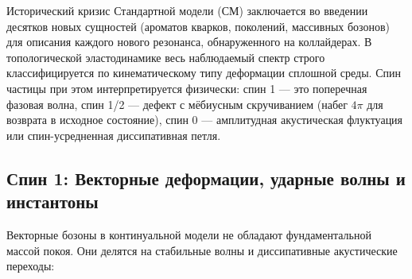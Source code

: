 \documentclass[11pt,a4paper]{article}
\begin{document}
	Исторический кризис Стандартной модели (СМ) заключается во введении десятков новых сущностей (ароматов кварков, поколений, массивных бозонов) для описания каждого нового резонанса, обнаруженного на коллайдерах. В топологической эластодинамике весь наблюдаемый спектр строго классифицируется по кинематическому типу деформации сплошной среды. Спин частицы при этом интерпретируется физически: спин 1 — это поперечная фазовая волна, спин 1/2 — дефект с мёбиусным скручиванием (набег $4\pi$ для возврата в исходное состояние), спин 0 — амплитудная акустическая флуктуация или спин-усредненная диссипативная петля.
	
	\subsection{Спин 1: Векторные деформации, ударные волны и инстантоны}
	Векторные бозоны в континуальной модели не обладают фундаментальной массой покоя. Они делятся на стабильные волны и диссипативные акустические переходы:
\end{document}
